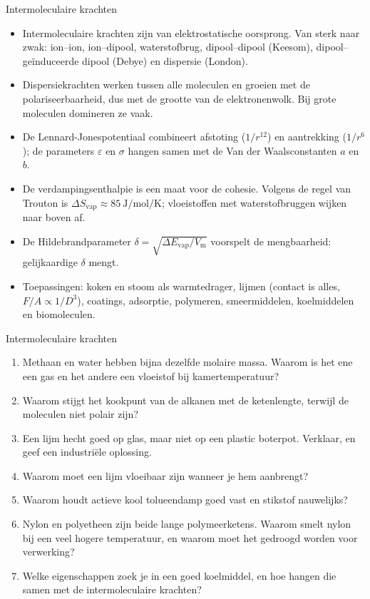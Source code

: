 \begin{samenvatting}{Intermoleculaire krachten}
\begin{itemize}
\item Intermoleculaire krachten zijn van elektrostatische oorsprong. Van sterk naar zwak: ion--ion, ion--dipool, waterstofbrug, dipool--dipool (Keesom), dipool--ge\"induceerde dipool (Debye) en dispersie (London).
\item Dispersiekrachten werken tussen alle moleculen en groeien met de polariseerbaarheid, dus met de grootte van de elektronenwolk. Bij grote moleculen domineren ze vaak.
\item De Lennard-Jonespotentiaal combineert afstoting ($1/r^{12}$) en aantrekking ($1/r^6$); de parameters $\varepsilon$ en $\sigma$ hangen samen met de Van der Waalsconstanten $a$ en $b$.
\item De verdampingsenthalpie is een maat voor de cohesie. Volgens de regel van Trouton is $\Delta S_\mathrm{vap} \approx \SI{85}{\joule\per\mole\per\kelvin}$; vloeistoffen met waterstofbruggen wijken naar boven af.
\item De Hildebrandparameter $\delta = \sqrt{\Delta E_\mathrm{vap}/V_\mathrm{m}}$ voorspelt de mengbaarheid: gelijkaardige $\delta$ mengt.
\item Toepassingen: koken en stoom als warmtedrager, lijmen (contact is alles, $F/A \propto 1/D^3$), coatings, adsorptie, polymeren, smeermiddelen, koelmiddelen en biomoleculen.
\end{itemize}
\end{samenvatting}

\begin{reflectie}{Intermoleculaire krachten}
\begin{enumerate}
\item Methaan en water hebben bijna dezelfde molaire massa. Waarom is het ene een gas en het andere een vloeistof bij kamertemperatuur?
\item Waarom stijgt het kookpunt van de alkanen met de ketenlengte, terwijl de moleculen niet polair zijn?
\item Een lijm hecht goed op glas, maar niet op een plastic boterpot. Verklaar, en geef een industri\"ele oplossing.
\item Waarom moet een lijm vloeibaar zijn wanneer je hem aanbrengt?
\item Waarom houdt actieve kool tolueendamp goed vast en stikstof nauwelijks?
\item Nylon en polyetheen zijn beide lange polymeerketens. Waarom smelt nylon bij een veel hogere temperatuur, en waarom moet het gedroogd worden voor verwerking?
\item Welke eigenschappen zoek je in een goed koelmiddel, en hoe hangen die samen met de intermoleculaire krachten?
\end{enumerate}
\end{reflectie}

